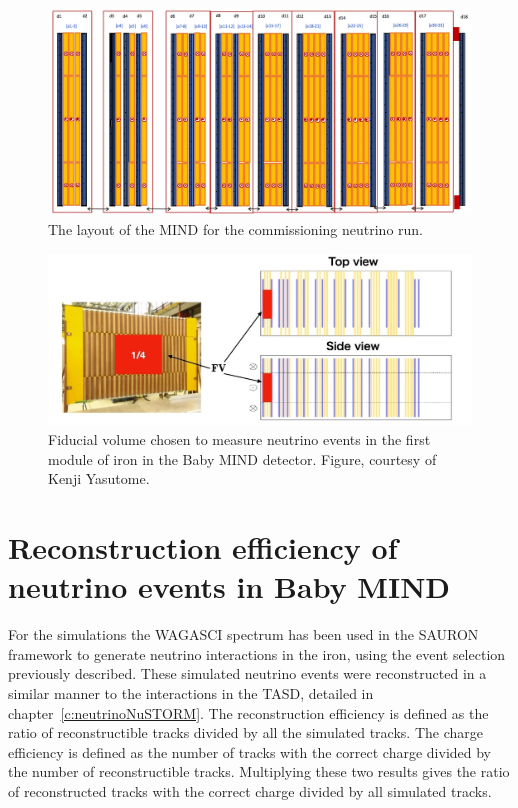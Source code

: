 \begin{figure}
\centering
\includegraphics[width=\textwidth]{figures/NeutrinoChap/NuFactTalk/Layout300118.jpeg}
\caption{The layout of the MIND for the commissioning neutrino run.}
\label{fig:MINDneutrinoLayout}
\end{figure}

\begin{figure}
\centering
\includegraphics[width=\textwidth]{figures/NeutrinoChap/NuFactTalk/eventRateCheck.jpeg}
\caption{Fiducial volume chosen to measure neutrino events in the first module of iron in the Baby MIND detector. Figure, courtesy of Kenji Yasutome.}
\label{fig:MINDFiducial}
\end{figure}

\section{Reconstruction efficiency of neutrino events in Baby MIND}


For the simulations the WAGASCI spectrum has been used in the SAURON framework to generate neutrino interactions in the iron, using the event selection previously described. These simulated neutrino events were reconstructed in a similar manner to the interactions in the TASD, detailed in chapter~\ref{c:neutrinoNuSTORM}. The reconstruction efficiency is defined as the ratio of reconstructible tracks divided by all the simulated tracks. The charge efficiency is defined as the number of tracks with the correct charge divided by the number of reconstructible tracks. Multiplying these two results gives the ratio of reconstructed tracks with the correct charge divided by all simulated tracks.

